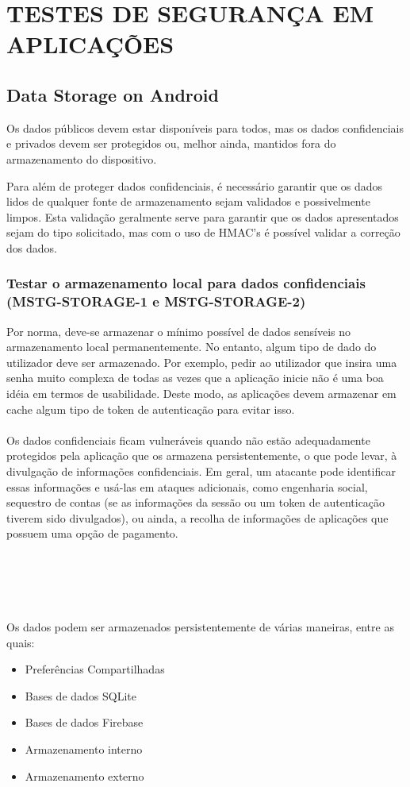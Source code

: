 \section{TESTES DE SEGURANÇA EM APLICAÇÕES}

\subsection{Data Storage on Android}
Os dados públicos devem estar disponíveis para todos, mas os dados confidenciais e privados devem ser protegidos ou, melhor ainda, mantidos fora do armazenamento do dispositivo.

Para além de proteger dados confidenciais, é necessário garantir que os dados lidos de qualquer fonte de armazenamento sejam validados e possivelmente limpos. Esta validação geralmente serve para garantir que os dados apresentados sejam do tipo solicitado, mas com o uso de HMAC's é possível validar a correção dos dados.


\subsubsection{Testar o armazenamento local para dados confidenciais (MSTG-STORAGE-1 e MSTG-STORAGE-2)}
Por norma, deve-se armazenar o mínimo possível de dados sensíveis no armazenamento local permanentemente. No entanto, algum tipo de dado do utilizador deve ser armazenado. Por exemplo, pedir ao utilizador que insira uma senha muito complexa de todas as vezes que a aplicação inicie não é uma boa idéia em termos de usabilidade. Deste modo, as aplicações devem armazenar em cache algum tipo de token de autenticação para evitar isso.
\\
\\
Os dados confidenciais ficam vulneráveis quando não estão adequadamente protegidos pela aplicação que os armazena persistentemente, o que pode levar, à divulgação de informações confidenciais. Em geral, um atacante pode identificar essas informações e usá-las em ataques adicionais, como engenharia social, sequestro de contas (se as informações da sessão ou um token de autenticação tiverem sido divulgados), ou ainda, a recolha de informações de aplicações que possuem uma opção de pagamento.
\\
\\
\\
\\
\\
\\
Os dados podem ser armazenados persistentemente de várias maneiras, entre as quais:
\begin{itemize}
    \item Preferências Compartilhadas
    \item Bases de dados SQLite
    \item Bases de dados Firebase
    \item Armazenamento interno
    \item Armazenamento externo
\end{itemize}


